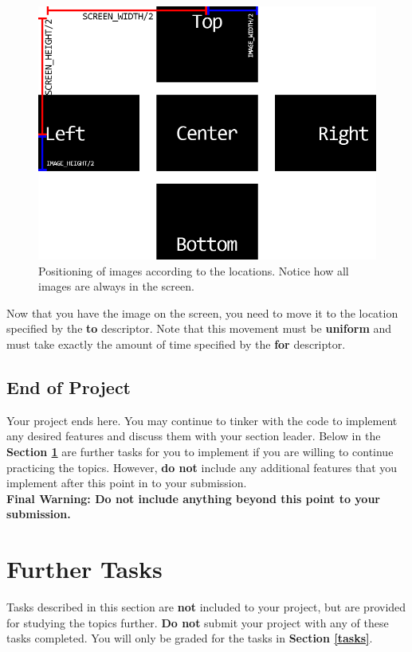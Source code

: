 \documentclass[a4paper]{article}
\begin{document}
	\begin{figure}[!htb]
		\centering
		\includegraphics[width=1\textwidth]{../img/image_placement.png}
		\caption{Positioning of images according to the locations. Notice how all images are always in the screen.}
	\end{figure}
	
	Now that you have the image on the screen, you need to move it to the location specified by the \textbf{to} descriptor. Note that this movement must be \textbf{uniform} and must take exactly the amount of time specified by the \textbf{for} descriptor.
	
	\newpage
	
	\subsection{End of Project}
	Your project ends here. You may continue to tinker with the code to implement any desired features and discuss them with your section leader. Below in the \textbf{Section \ref{further}} are further tasks for you to implement if you are willing to continue practicing the topics. However, \textbf{do not} include any additional features that you implement after this point in to your submission.  
	\\
	
	\noindent \textbf{Final Warning: Do not include anything beyond this point to your submission.} 
	
	\newpage
	
	\section{Further Tasks}
	\label{further}
	Tasks described in this section are \textbf{not} included to your project, but are provided for studying the topics further. \textbf{Do not} submit your project with any of these tasks completed. You will only be graded for the tasks in \textbf{Section \ref{tasks}}.
\end{document}

